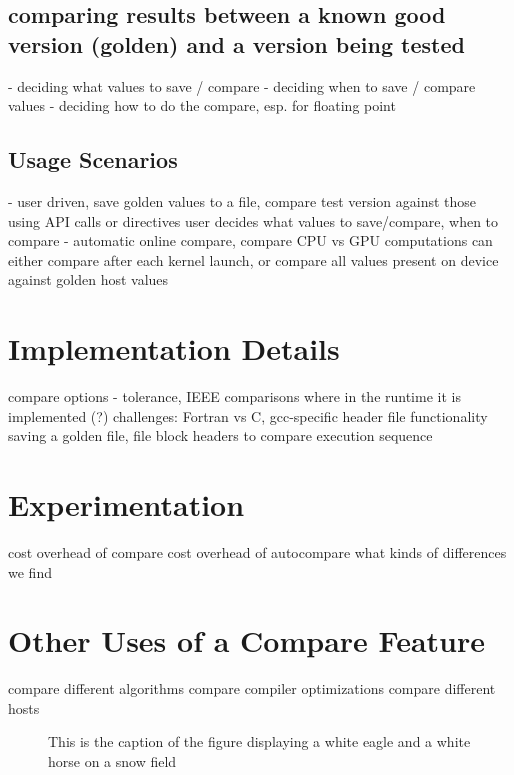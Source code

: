 \documentclass{llncs}
\begin{document}
\subsection{comparing results between a known good version (golden) and a version being tested}
  - deciding what values to save / compare
  - deciding when to save / compare values
  - deciding how to do the compare, esp. for floating point
\subsection{Usage Scenarios}
  - user driven, save golden values to a file, compare test version against those
    using API calls or directives
    user decides what values to save/compare, when to compare
  - automatic online compare, compare CPU vs GPU computations
    can either compare after each kernel launch, or
    compare all values present on device against golden host values


\section{Implementation Details}
   compare options - tolerance, IEEE comparisons
   where in the runtime it is implemented (?)
   challenges: Fortran vs C, gcc-specific header file functionality
   saving a golden file, file block headers to compare execution sequence

\section{Experimentation}
   cost overhead of compare
   cost overhead of autocompare
   what kinds of differences we find

\section{Other Uses of a Compare Feature}
   compare different algorithms
   compare compiler optimizations
   compare different hosts



\begin{figure}
\vspace{2.5cm}
\caption{This is the caption of the figure displaying a white eagle and
a white horse on a snow field}
\end{figure}
\end{document}
